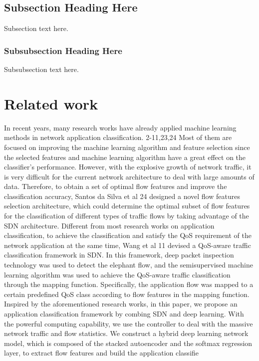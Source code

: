 \documentclass[10pt,journal,compsoc]{IEEEtran}
\begin{document}
% 

\subsection{Subsection Heading Here}
Subsection text here.


\subsubsection{Subsubsection Heading Here}
Subsubsection text here.

\section{Related work}
\cite{Zhang2018}
In recent years, many research works have already applied machine learning methods in network application
classification.
2-11,23,24
Most of them are focused on improving the machine learning algorithm and feature selection since
the selected features and machine learning algorithm have a great effect on the classifier's performance.
However, with the explosive growth of network traffic, it is very difficult for the current network architecture to deal with
large amounts of data. Therefore, to obtain a set of optimal flow features and improve the classification accuracy, Santos
da Silva et al
24
designed a novel flow features selection architecture, which could determine the optimal subset of flow
features for the classification of different types of traffic flows by taking advantage of the SDN architecture. 
 Different from most research works on application classification, to achieve the classification and satisfy
the QoS requirement of the network application at the same time, Wang et al
11
devised a QoS-aware traffic classification
framework in SDN. In this framework, deep packet inspection technology was used to detect the elephant flow, and the
semisupervised machine learning algorithm was used to achieve the QoS-aware traffic classification through the mapping
function. Specifically, the application flow was mapped to a certain predefined QoS class according to flow features in the
mapping function. Inspired by the aforementioned research works, in this paper, we propose an application classification framework by
combing SDN and deep learning. With the powerful computing capability, we use the controller to deal with the massive
network traffic and flow statistics. We construct a hybrid deep learning network model, which is composed of the stacked
autoencoder and the softmax regression layer, to extract flow features and build the application classifie
\end{document}
